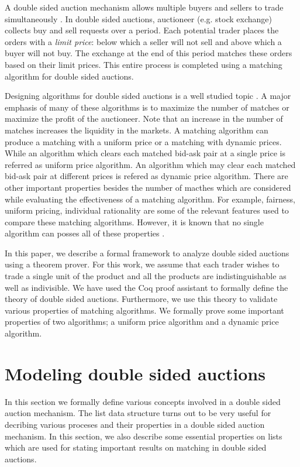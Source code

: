 \documentclass[a4paper,UKenglish,cleveref, autoref]{lipics-v2019}
\begin{document}
A double sided auction mechanism allows multiple buyers and sellers to trade simultaneously \cite{friedman}. In double sided auctions,  auctioneer (e.g. stock exchange) collects buy and sell requests over a period. Each potential trader places the orders with a \emph{limit price}: below which a seller will not sell and above which a buyer will not buy. The exchange at the end of this period matches these orders based on their limit prices. This entire process is completed using a matching algorithm for double sided auctions.  

Designing algorithms for double sided auctions is a well studied topic \cite{mcafee1992, WurmanWW98,NiuP13, ZhaoZKP10}.  A major emphasis of many of these algorithms is to maximize the number of matches or maximize the profit of the auctioneer. Note that an increase in the number of matches increases the liquidity in the markets. A matching algorithm can produce a matching with a uniform price or a matching with dynamic prices. While an algorithm which clears each matched bid-ask pair at a single price is referred as uniform price algorithm.  An algorithm which may clear each matched bid-ask pair at different prices is refered as  dynamic price algorithm. There are other important properties besides the number of macthes which are considered while evaluating the effectiveness of a matching algorithm. For example, fairness, uniform pricing, individual rationality are some of the relevant features used to compare these matching algorithms. However, it is known that no single algorithm can posses all of these properties \cite{WurmanWW98,mcafee1992}. 

In this paper, we describe a formal framework to analyze double sided auctions using a theorem prover.  For this work, we assume that each trader wishes to trade a single unit of the product and all the products are indistinguishable as well as indivisible. We have used the Coq proof assistant to formally  define the theory of double sided auctions.  Furthermore, we use this theory to validate various properties of matching algorithms. We formally prove some important properties of two algorithms; a uniform price algorithm and a dynamic price algorithm. 

\section{Modeling double sided auctions}
In this section we formally define various concepts involved in a double sided auction mechanism. The list data structure turns out to be very useful for decribing various proceses and their properties  in a double sided auction mechanism. In this section, we also describe some essential properties on lists which are used for stating important results on matching in double sided auctions. 
\end{document}
